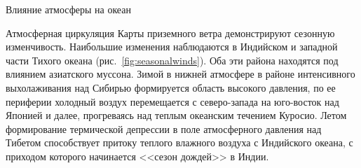 \begin{chapter}{Влияние атмосферы на океан}
\begin{section}{Атмосферная циркуляция}
Карты приземного ветра демонстрируют сезонную изменчивость. Наибольшие
изменения наблюдаются в Индийском и западной части
Тихого океана (рис.~\ref{fig:seasonalwinds}). Оба эти района находятся под 
влиянием азиатского муссона. Зимой в нижней атмосфере в районе интенсивного 
выхолаживания над Сибирью формируется область высокого давления, 
по ее периферии холодный воздух перемещается с северо-запада на юго-восток 
над Японией и далее, прогреваясь над теплым океанским течением Куросио. Летом
формирование термической депрессии в поле атмосферного давления над
Тибетом способствует притоку теплого влажного воздуха с Индийского
океана, с приходом которого начинается <<сезон дождей>> в Индии.
%


\end{section}
\end{chapter}
